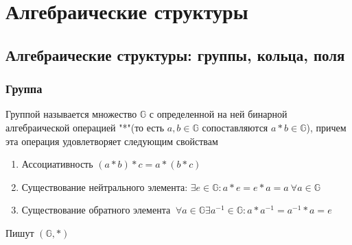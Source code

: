 
\section{Алгебраические структуры}

\subsection{Алгебраические структуры: группы, кольца, поля}

\subsubsection{Группа}
\begin{definition}
	Группой называется множество \(\mathbb{G}\) с определенной на ней бинарной алгебраической операцией "*"(то есть \(a,b \in \mathbb{G}\) сопоставляются \(a*b\in\mathbb{G}\)), причем эта операция удовлетворяет следующим свойствам
	\begin{enumerate}
		\item Ассоциативность \((a*b)*c = a*(b*c)\)
		\item Существование нейтрального элемента: \(\exists e\in\mathbb{G}: a*e = e*a=a \: \forall a\in\mathbb{G}\)
		\item Существование обратного элемента \(\: \forall a\in\mathbb{G} \exists a^{-1}\in\mathbb{G}: a*a^{-1} = a^{-1}*a = e\)
	\end{enumerate}
	Пишут \((\mathbb{G}, *)\)
\end{definition}
